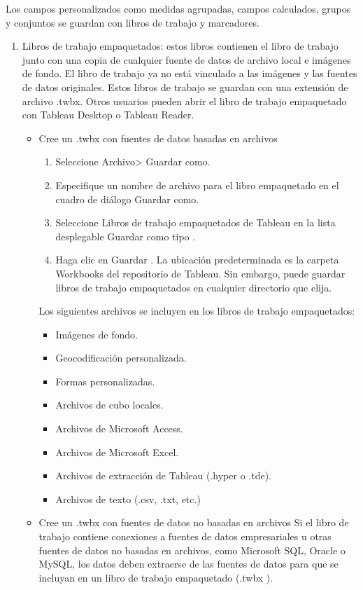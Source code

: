\documentclass[
]{book}
\providecommand{\tightlist}{%
  \setlength{\itemsep}{0pt}\setlength{\parskip}{0pt}}
\begin{document}
Los campos personalizados como medidas agrupadas, campos calculados, grupos y conjuntos se guardan con libros de trabajo y marcadores.

\begin{enumerate}
\def\labelenumi{\arabic{enumi}.}
\setcounter{enumi}{4}
\tightlist
\item
  Libros de trabajo empaquetados: estos libros contienen el libro de trabajo junto con una copia de cualquier fuente de datos de archivo local e imágenes de fondo. El libro de trabajo ya no está vinculado a las imágenes y las fuentes de datos originales. Estos libros de trabajo se guardan con una extensión de archivo .twbx. Otros usuarios pueden abrir el libro de trabajo empaquetado con Tableau Desktop o Tableau Reader.

  \begin{itemize}
  \tightlist
  \item
    Cree un .twbx con fuentes de datos basadas en archivos

    \begin{enumerate}
    \def\labelenumii{\arabic{enumii}.}
    \tightlist
    \item
      Seleccione Archivo\textgreater{} Guardar como.
    \item
      Especifique un nombre de archivo para el libro empaquetado en el
      cuadro de diálogo Guardar como.
    \item
      Seleccione Libros de trabajo empaquetados de Tableau en la lista
      desplegable Guardar como tipo .
    \item
      Haga clic en Guardar .
      La ubicación predeterminada es la carpeta Workbooks del repositorio de Tableau. Sin embargo, puede guardar libros de trabajo empaquetados en cualquier directorio que elija.
    \end{enumerate}

    Los siguientes archivos se incluyen en los libros de trabajo empaquetados:

    \begin{itemize}
    \tightlist
    \item
      Imágenes de fondo.
    \item
      Geocodificación personalizada.
    \item
      Formas personalizadas.
    \item
      Archivos de cubo locales.
    \item
      Archivos de Microsoft Access.
    \item
      Archivos de Microsoft Excel.
    \item
      Archivos de extracción de Tableau (.hyper o .tde).
    \item
      Archivos de texto (.csv, .txt, etc.)
    \end{itemize}
  \item
    Cree un .twbx con fuentes de datos no basadas en archivos
    Si el libro de trabajo contiene conexiones a fuentes de datos
    empresariales u otras fuentes de datos no basadas en archivos, como
    Microsoft SQL, Oracle o MySQL, los datos deben extraerse de las fuentes de
    datos para que se incluyan en un libro de trabajo empaquetado (.twbx ).


\end{itemize}
\end{enumerate}
\end{document}
